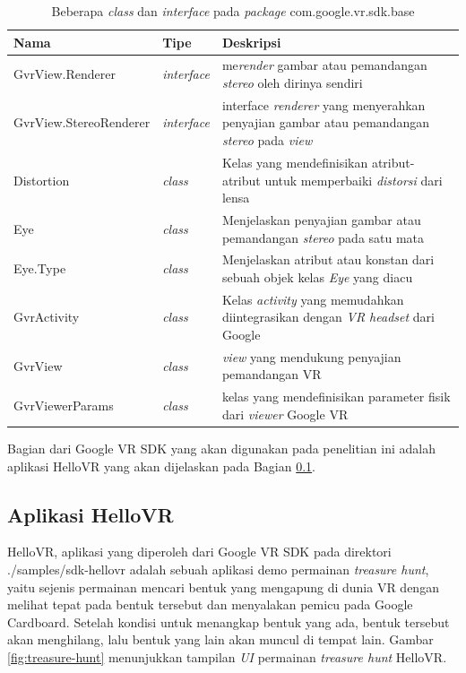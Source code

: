 \begin{table}[ht!]
	\centering
	\caption{Beberapa \textit{class} dan \textit{interface} pada \textit{package} com.google.vr.sdk.base}
	\label{tab:kelas-google-vr}
	\begin{tabular}{|p{5cm}|p{3cm}|p{4cm}|}
	\hline
		Nama & Tipe & Deskripsi\\ \hline \hline
		GvrView.Renderer & \textit{interface} & me\textit{render} gambar atau pemandangan \textit{stereo} oleh dirinya sendiri\\ \hline
		GvrView.StereoRenderer & \textit{interface} & interface \textit{renderer} yang menyerahkan penyajian gambar atau pemandangan \textit{stereo} pada \textit{view}\\ \hline
		Distortion & \textit{class} & Kelas yang mendefinisikan atribut-atribut untuk memperbaiki \textit{distorsi} dari lensa\\ \hline
		Eye & \textit{class} & Menjelaskan penyajian gambar atau pemandangan \textit{stereo} pada satu mata \\ \hline
		Eye.Type & \textit{class} & Menjelaskan atribut atau konstan dari sebuah objek kelas \textit{Eye} yang diacu\\ \hline
		GvrActivity & \textit{class} & Kelas \textit{activity} yang memudahkan diintegrasikan dengan \textit{VR headset} dari Google\\ \hline
		GvrView & \textit{class} & \textit{view} yang mendukung penyajian pemandangan VR \\ \hline
		GvrViewerParams & \textit{class} & kelas yang mendefinisikan parameter fisik dari \textit{viewer} Google VR \\ \hline
	\hline
	\end{tabular}
\end{table}
 
Bagian dari Google VR SDK yang akan digunakan pada penelitian ini adalah aplikasi HelloVR yang akan dijelaskan pada Bagian \ref{subs:hello-vr}. 

\subsection{Aplikasi HelloVR}
\label{subs:hello-vr}
HelloVR, aplikasi yang diperoleh dari Google VR SDK pada direktori ./samples/sdk-hellovr adalah sebuah aplikasi demo permainan \textit{treasure hunt}, yaitu sejenis permainan mencari bentuk yang mengapung di dunia VR dengan melihat tepat pada bentuk tersebut dan menyalakan pemicu pada Google Cardboard. Setelah kondisi untuk menangkap bentuk yang ada, bentuk tersebut akan menghilang, lalu bentuk yang lain akan muncul di tempat lain. Gambar \ref{fig:treasure-hunt} menunjukkan tampilan \textit{UI} permainan \textit{treasure hunt} HelloVR. 

